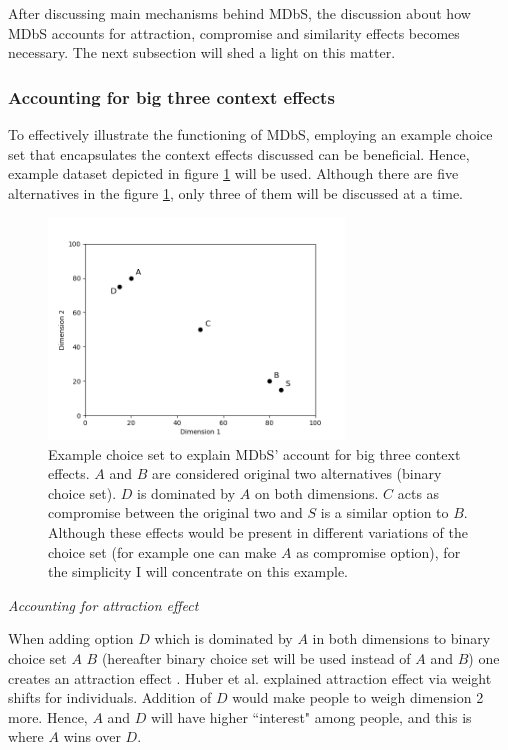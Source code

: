 \documentclass[a4paper,12pt]{article}
\newcommand{\citeyearonly}[1]{\citeyearpar{#1}}
\begin{document}
After discussing main mechanisms behind MDbS, the discussion about how MDbS accounts for attraction, compromise and similarity effects becomes necessary. The next subsection will shed a light on this matter.

\subsubsection{Accounting for big three context effects}

To effectively illustrate the functioning of MDbS, employing an example choice set that encapsulates the context effects discussed can be beneficial. Hence, example dataset depicted in figure \ref{fig:MDBsContextExample} will be used. Although there are five alternatives in the figure \ref{fig:MDBsContextExample}, only three of them will be discussed at a time.

\begin{figure}[h]
    \centering
    \includegraphics[width=0.7\textwidth]{staticFiles/contextEffectExampleScatterplot.png}
    \caption{Example choice set to explain MDbS' account for big three context effects. $A$ and $B$ are considered original two alternatives (binary choice set). $D$ is dominated by $A$ on both dimensions. $C$ acts as compromise between the original two and $S$ is a similar option to $B$. Although these effects would be present in different variations of the choice set (for example one can make $A$ as compromise option), for the simplicity I will concentrate on this example.} %
    \label{fig:MDBsContextExample} %

\end{figure}

\textit{Accounting for attraction effect}

When adding option $D$ which is dominated by $A$ in both dimensions to binary choice set $A$ $B$ (hereafter binary choice set will be used instead of $A$ and $B$) one creates an attraction effect \citep{huberEtAl82, huberPuto83}. Huber et al. \citeyearonly{huberEtAl82} explained attraction effect via weight shifts for individuals. Addition of $D$ would make people to weigh dimension 2 more. Hence, $A$ and $D$ will have higher ``interest" among people, and this is where $A$ wins over $D$.
\end{document}
